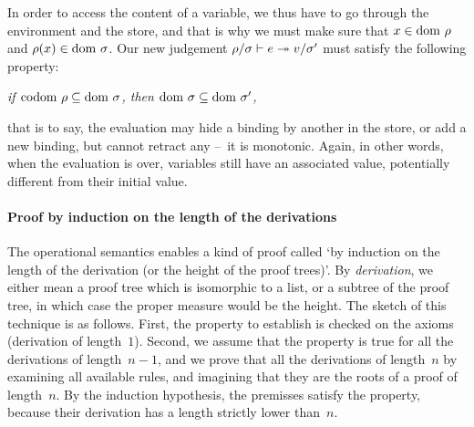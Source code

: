 In order to access the content of a variable, we thus have to go
through the environment and the store, and that is why we must make
sure that $x \in \mathrm{dom}~\rho$ and $\rho(x) \in \mathrm{dom}~\sigma$. Our new
judgement ${\rho}/{\sigma} \vdash {e} \twoheadrightarrow {v}/{\sigma'}$ must satisfy the
following property:
\begin{center}
\sl if $\mathrm{codom}~\rho \subseteq \mathrm{dom}~\sigma$, then
$\mathrm{dom}~\sigma \subseteq \mathrm{dom}~\sigma'$,
\end{center}
that is to say, the evaluation may hide a binding by another in the
store, or add a new binding, but cannot retract any --~it is
monotonic. Again, in other words, when the evaluation is over,
variables still have an associated value, potentially different from
their initial value.

\paragraph{Proof by induction on the length of the derivations}

The operational semantics enables a kind of proof called `by induction
on the length of the derivation (or the height of the proof
trees)'. By \emph{derivation}, we either mean a proof tree which is
isomorphic to a list, or a subtree of the proof tree, in which case
the proper measure would be the height. The sketch of this technique
is as follows. First, the property to establish is checked on the
axioms (derivation of length~\(1\)). Second, we assume that the
property is true for all the derivations of length~\(n-1\), and we
prove that all the derivations of length~\(n\) by examining all
available rules, and imagining that they are the roots of a proof of
length~\(n\). By the induction hypothesis, the premisses satisfy the
property, because their derivation has a length strictly lower
than~\(n\).

